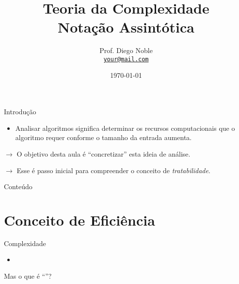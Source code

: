 \documentclass[
    mode=present,
    style=dvn,
    paper=screen,
    display=slidesnotes,
    size=14pt,
]{powerdot}
\title{Teoria da Complexidade \\
    \small Notação Assintótica\\}
\author{\smallskip Prof. Diego Noble \\%
\texttt{\href{mailto:your@mail.com}{\color{pdcolor4}your@mail.com}}}%
\date{\today}
\begin{document}
\maketitle

\begin{slide}{Introdução}
    \begin{itemize}
        \item Analisar algoritmos significa determinar os recursos computacionais que
        o algoritmo requer conforme o tamanho da entrada aumenta.
    \end{itemize}
    \bigskip
    
    $\rightarrow$ O objetivo desta aula é ``concretizar'' esta ideia de análise.\pause

    $\rightarrow$ Esse é passo inicial para compreender o conceito de \textit{tratabilidade}.
\end{slide}


\begin{slide}{Conteúdo}
    \Large
    \tableofcontents[content=sections]
\end{slide}
\section{Conceito de Eficiência}
\begin{slide}{Complexidade}
    \Large
    \begin{itemize}
    \item {}
    \end{itemize}
    Mas o que é ``''?
\end{slide}
\end{document}

